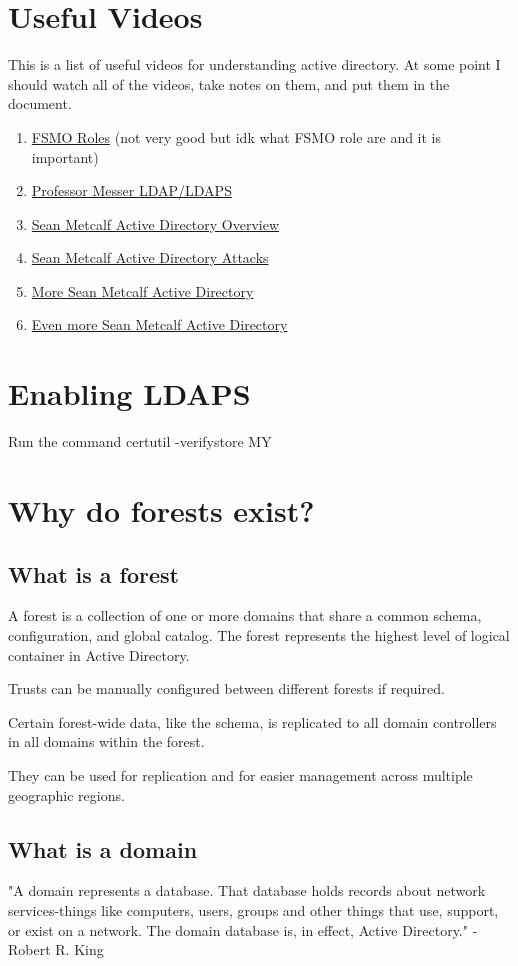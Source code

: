\documentclass{article}
\begin{document}
\section{Useful Videos}
This is a list of useful videos for understanding active directory.
At some point I should watch all of the videos, take notes on them, and put them in the document.
\begin{enumerate}
        \item \href{https://youtu.be/n5suPvKqo_Y}{FSMO Roles} (not very good but idk what FSMO role are and it is important)
        \item \href{https://youtu.be/5rEA7vRV3VE}{Professor Messer LDAP/LDAPS}
        \item \href{https://youtu.be/2w1cesS7pGY}{Sean Metcalf Active Directory Overview}
        \item \href{https://youtu.be/ze1UcSLOypw}{Sean Metcalf Active Directory Attacks}
        \item \href{https://youtu.be/Lz6haohGAMc}{More Sean Metcalf Active Directory}
        \item\href{https://youtu.be/b6GUXerE9Ac}{Even more Sean Metcalf Active Directory}
\end{enumerate}

\section{Enabling LDAPS}
Run the command certutil -verifystore MY

\section{Why do forests exist?}
\subsection{What is a forest}
A forest is a collection of one or more domains that 
share a common schema, configuration, and global 
catalog. The forest represents the highest 
level of logical container in Active Directory.

Trusts can be manually configured between different forests if required.

Certain forest-wide data, like the schema, 
is replicated to all domain controllers in all domains within the forest.

They can be used for replication and for
easier management across multiple geographic regions.

\subsection{What is a domain}
"A domain represents a database. 
That database holds records about
 network services-things like computers, users, groups and other 
 things that use, support, or exist on a network. The domain database is, 
 in effect, Active Directory."
 - Robert R. King
\end{document}

